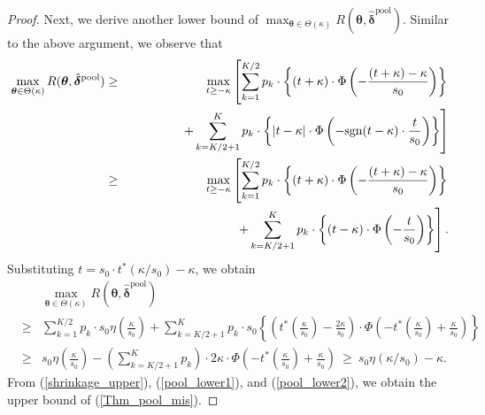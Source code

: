 \documentclass[12pt,a4paper]{article}
\begin{document}
\begin{proof}
Next, we derive another lower bound of $\max_{\bm{\theta} \in \Theta(\kappa)} R(\bm{\theta},\hat{\bm{\delta}}^{\mathrm{pool}})$. Similar to the above argument, we observe that
\begin{eqnarray*}
\max_{\bm{\theta} \in \Theta(\kappa)} R(\bm{\theta},\hat{\bm{\delta}}^{\mathrm{pool}}) & \geq & \max_{t \geq -\kappa} \left[ \sum_{k=1}^{K/2} p_k \cdot \left\{ (t+\kappa) \cdot \Phi \left( - \frac{(t+\kappa)-\kappa}{s_0} \right) \right\} \right. \\
& & \hspace{0.5in} \left. + \sum_{k=K/2 + 1}^{K} p_k \cdot \left\{ |t-\kappa| \cdot \Phi \left( - \text{sgn}(t-\kappa) \cdot \frac{t}{s_0} \right) \right\} \right] \\
& \geq & \max_{t \geq -\kappa} \left[ \sum_{k=1}^{K/2} p_k \cdot \left\{ (t+\kappa) \cdot \Phi \left( - \frac{(t+\kappa)-\kappa}{s_0} \right) \right\} \right. \\
& & \hspace{1.2in} \left. + \sum_{k=K/2 + 1}^{K} p_k \cdot \left\{ (t-\kappa) \cdot \Phi \left( - \frac{t}{s_0} \right) \right\} \right].
\end{eqnarray*}
Substituting $t = s_0 \cdot t^{\ast}(\kappa / s_0) - \kappa$, we obtain
\begin{eqnarray}
& & \max_{\bm{\theta} \in \Theta(\kappa)} R(\bm{\theta},\hat{\bm{\delta}}^{\mathrm{pool}}) \nonumber \\
& \geq &  \sum_{k=1}^{K/2} p_k \cdot s_0 \eta \left( \frac{\kappa}{s_0} \right) + \sum_{k=K/2 + 1}^{K} p_k \cdot s_0 \left\{ \left( t^{\ast}\left( \frac{\kappa}{s_0} \right)  - \frac{2 \kappa}{s_0} \right) \cdot \Phi \left( -  t^{\ast}\left( \frac{\kappa}{s_0} \right) + \frac{\kappa}{s_0}  \right) \right\} \nonumber \\
& \geq & s_0 \eta \left( \frac{\kappa}{s_0} \right) - \left( \sum_{k=K/2 + 1}^{K} p_k \right) \cdot 2 \kappa \cdot \Phi \left( -  t^{\ast}\left( \frac{\kappa}{s_0} \right) + \frac{\kappa}{s_0}  \right) \ \geq \ s_0 \eta(\kappa / s_0) - \kappa. \label{pool_lower2}
\end{eqnarray}
From (\ref{shrinkage_upper}), (\ref{pool_lower1}), and (\ref{pool_lower2}), we obtain the upper bound of (\ref{Thm_pool_mis}).
\end{proof}\vspace{0.1in}
\end{document}
